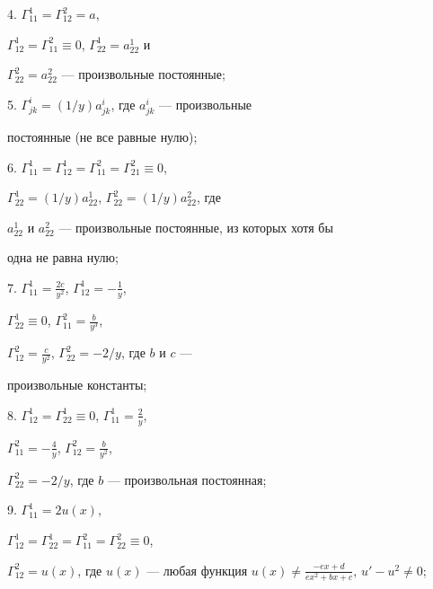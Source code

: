 4. $\Gamma^1_{11}=\Gamma^2_{12}=a$, 


$\Gamma^1_{12}=\Gamma^2_{11}\equiv0$, $\Gamma^1_{22}=a^1_{22}$ и 


$\Gamma^2_{22}=a^2_{22}$ --- произвольные постоянные; 


\smallskip


 


5. $\Gamma^i_{jk}=(1/y)a^i_{jk}$, где $a^i_{jk}$ --- произвольные 


постоянные (не все равные нулю); 


\smallskip


 


6. $\Gamma^1_{11}=\Gamma^1_{12}=\Gamma^2_{11}=\Gamma^2_{21}\equiv0$, 


$\Gamma^1_{22}=(1/y)a^1_{22}$, $\Gamma^2_{22}=(1/y)a^2_{22}$, где 


$a^1_{22}$ и $a^2_{22}$ --- произвольные постоянные, из которых хотя бы 


одна не равна нулю; 


\smallskip


 


7. $\Gamma^1_{11}=\frac{2c}{y^2}$, $\Gamma^1_{12}=-\frac{1}{y}$, 


$\Gamma^1_{22}\equiv0$, $\Gamma^2_{11}=\frac{b}{y^3}$, 


$\Gamma^2_{12}=\frac{c}{y^2}$, $\Gamma^2_{22}=-2/y$, где $b$ и $c$ --- 


произвольные константы; 


\smallskip


 


8. $\Gamma^1_{12}=\Gamma^1_{22}\equiv0$, $\Gamma^1_{11}=\frac{2}{y}$, 


$\Gamma^2_{11}=-\frac{4}{y}$, $\Gamma^2_{12}=\frac{b}{y^2}$, 


$\Gamma^2_{22}=-2/y$, где $b$ --- произвольная постоянная; 


\smallskip


 


9. $\Gamma^1_{11}=2u(x)$, 


$\Gamma^1_{12}=\Gamma^1_{22}=\Gamma^2_{11}=\Gamma^2_{22}\equiv0$, 


$\Gamma^2_{12}=u(x)$, где $u(x)$ --- любая функция $u(x)\ne\frac{-e 


x+d}{e x^2+b x+c}$, $u'-u^2\ne0$; 


